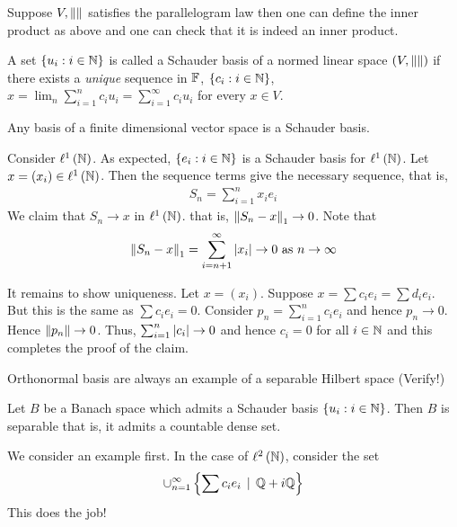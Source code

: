     Suppose $V, \left\lVert  \right\rVert$ satisfies the parallelogram law then one can define the inner product as above and one can check that it is indeed an inner product.


\horz

A set $\left\{ u_{i} : i \in \mathbb N \right\}$ is called a Schauder basis of a normed linear space $( V, \left\lVert   \right\rVert )$ if there exists a \textit{unique} sequence in $\mathbb F$, $\left\{ c_{i} : i \in \mathbb N \right\}$, $x= \lim_{n} \sum_{i=1}^{n} c_{i} u_{i} = \sum_{i=1}^{\infty} c_{i} u_{i}$ for every $x\in V$.

Any basis of a finite dimensional vector space is a Schauder basis.

Consider $\ell ^{1} \left( \mathbb N \right)$. As expected, $\left\{ e_{i} : i \in \mathbb N \right\}$ is a Schauder basis for $\ell ^{1} \left( \mathbb N \right)$. Let $x= \left( x_{i} \right) \in \ell ^{1} \left( \mathbb N\right)$. Then the sequence terms give the necessary sequence, that is,
\begin{align*}
    S_{n } = \sum_{i=1}^{n} x_{i} e_{i}
\end{align*}
We claim that $S_{n} \to x$ in $\ell ^{1}  \left( \mathbb N \right)$. that is, $\left\lVert S_{n} - x \right\rVert_{1} \to 0$. Note that
\begin{equation*}
    \left\lVert S_{n} - x \right\rVert_{1} = \sum_{i=n+1} ^{\infty} \left\lvert x_i \right\rvert \to 0 \text{ as } n\to \infty
\end{equation*}

It remains to show uniqueness. Let $x= \left( x_{i} \right)$. Suppose $x=\sum c_{i} e_{i} = \sum d_{i} e_{i}$. But this is the same as $\sum c_{i} e_{i} = 0$.  Consider $p_{n} = \sum_{i=1}^{n} c_{i} e_{i}$ and hence $p_{n} \to 0$. Hence $\left\lVert p_{n} \right\rVert \to 0$. Thus, $\sum_{i=1}^{n} \left\lvert c_{i} \right\rvert \to 0$ and hence $c_{i} = 0$ for all $i\in \mathbb N$ and this completes the proof of the claim.


Orthonormal basis are always an example of a separable Hilbert space (Verify!)


\horz

\begin{proposition}
    Let $B$ be a Banach space which admits a Schauder basis $\left\{ u_{i} : i \in \mathbb N \right\}$. Then $B$ is separable that is, it admits a countable dense set.
\end{proposition}

We consider an example first. In the case of $\ell ^{2} \left( \mathbb N \right)$, consider the set
\begin{equation*}
    \cup_{n=1}^{\infty} \left\{ \sum c_{i} e_{i} \, \mid \, \mathbb Q + i \mathbb Q \right\}
\end{equation*}
This does the job!


